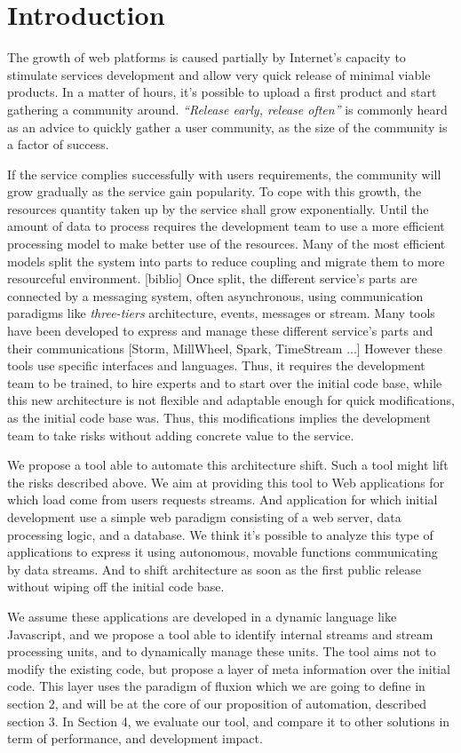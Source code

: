 \section{Introduction}


The growth of web platforms is caused partially by Internet's capacity to stimulate services development and allow very quick release of minimal viable products.
In a matter of hours, it's possible to upload a first product and start gathering a community around.
\textit{``Release early, release often''} is commonly heard as an advice to quickly gather a user community, as the size of the community is a factor of success.

If the service complies successfully with users requirements, the community will grow gradually as the service gain popularity.
To cope with this growth, the resources quantity taken up by the service shall grow exponentially.
Until the amount of data to process requires the development team to use a more efficient processing model to make better use of the resources.
Many of the most efficient models split the system into parts to reduce coupling and migrate them to more resourceful environment. [biblio]
Once split, the different service's parts are connected by a messaging system, often asynchronous, using communication paradigms like \textit{three-tiers} architecture, events, messages or stream.
Many tools have been developed to express and manage these different service's parts and their communications [Storm, MillWheel, Spark, TimeStream ...]
However these tools use specific interfaces and languages.
Thus, it requires the development team to be trained, to hire experts and to start over the initial code base, while this new architecture is not flexible and adaptable enough for quick modifications, as the initial code base was.
Thus, this modifications implies the development team to take risks without adding concrete value to the service.

We propose a tool able to automate this architecture shift.
Such a tool might lift the risks described above.
We aim at providing this tool to Web applications for which load come from users requests streams.
And application for which initial development use a simple web paradigm consisting of a web server, data processing logic, and a database.
We think it's possible to analyze this type of applications to express it using autonomous, movable functions communicating by data streams.
And to shift architecture as soon as the first public release without wiping off the initial code base.

We assume these applications are developed in a dynamic language like Javascript, and we propose a tool able to identify internal streams and stream processing units, and to dynamically manage these units.
The tool aims not to modify the existing code, but propose a layer of meta information over the initial code.
This layer uses the paradigm of fluxion which we are going to define in section 2, and will be at the core of our proposition of automation, described section 3.
In Section 4, we evaluate our tool, and compare it to other solutions in term of performance, and development impact.